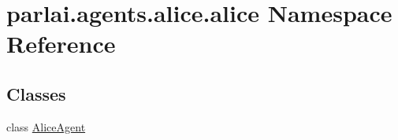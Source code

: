 \hypertarget{namespaceparlai_1_1agents_1_1alice_1_1alice}{}\section{parlai.\+agents.\+alice.\+alice Namespace Reference}
\label{namespaceparlai_1_1agents_1_1alice_1_1alice}
\subsection*{Classes}
\begin{DoxyCompactItemize}
\item 
class \hyperlink{classparlai_1_1agents_1_1alice_1_1alice_1_1AliceAgent}{Alice\+Agent}
\end{DoxyCompactItemize}
